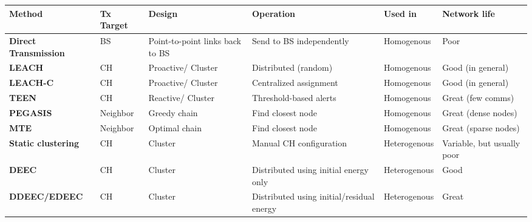 \begin{longtable}{LLLLLL}
\centering
\toprule
\textbf{Method}
&
\textbf{Tx Target}
&
\textbf{Design}
&
\textbf{Operation}
&
\textbf{Used in}
&
\textbf{Network life}
\\ \midrule
\textbf{Direct Transmission}
&
BS
&
Point-to-point links back to BS
&
Send to BS independently
&
Homogenous
&
Poor
\\ \midrule
\textbf{LEACH}
&
CH
&
Proactive/ Cluster
&
Distributed (random)
&
Homogenous
&
Good (in general)
\\ \midrule
\textbf{LEACH-C}
&
CH
&
Proactive/ Cluster
&
Centralized assignment
&
Homogenous
&
Good (in general)
\\ \midrule
\textbf{TEEN}
&
CH
&
Reactive/ Cluster
&
Threshold-based alerts
&
Homogenous
&
Great (few comms)
\\ \midrule
\textbf{PEGASIS}
&
Neighbor
&
Greedy chain
&
Find closest node
&
Homogenous
&
Great (dense nodes)
\\ \midrule
\textbf{MTE}
&
Neighbor
&
Optimal chain
&
Find closest node
&
Homogenous
&
Great (sparse nodes)
\\ \midrule
\textbf{Static clustering}
&
CH
&
Cluster
&
Manual CH configuration
&
Heterogenous
&
Variable, but usually poor
\\ \midrule
\textbf{DEEC}
&
CH
&
Cluster
&
Distributed using initial energy only
&
Heterogenous
&
Good
\\ \midrule
\textbf{DDEEC/EDEEC}
&
CH
&
Cluster
&
Distributed using initial/residual energy
&
Heterogenous
&
Great
\\
\bottomrule
\end{longtable}



